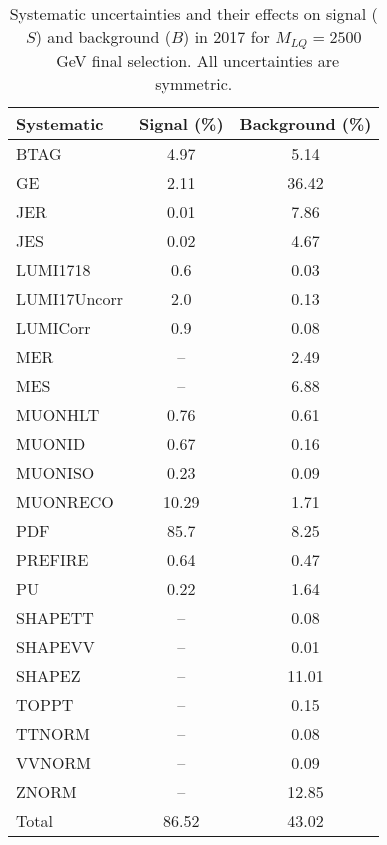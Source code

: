 \begin{table}[htbp]
\begin{center}
\caption{Systematic uncertainties and their effects on signal ($S$) and background ($B$) in 2017 for $M_{LQ}=2500$~GeV final selection. All uncertainties are symmetric.}
\begin{tabular}{lcc}
\hline\hline
Systematic & Signal (\%) & Background (\%) \\ \hline 
BTAG & 4.97 & 5.14\\ 
GE & 2.11 & 36.42\\ 
JER & 0.01 & 7.86\\ 
JES & 0.02 & 4.67\\ 
LUMI1718 & 0.6 & 0.03\\ 
LUMI17Uncorr & 2.0 & 0.13\\ 
LUMICorr & 0.9 & 0.08\\ 
MER & -- & 2.49\\ 
MES & -- & 6.88\\ 
MUONHLT & 0.76 & 0.61\\ 
MUONID & 0.67 & 0.16\\ 
MUONISO & 0.23 & 0.09\\ 
MUONRECO & 10.29 & 1.71\\ 
PDF & 85.7 & 8.25\\ 
PREFIRE & 0.64 & 0.47\\ 
PU & 0.22 & 1.64\\ 
SHAPETT & -- & 0.08\\ 
SHAPEVV & -- & 0.01\\ 
SHAPEZ & -- & 11.01\\ 
TOPPT & -- & 0.15\\ 
TTNORM & -- & 0.08\\ 
VVNORM & -- & 0.09\\ 
ZNORM & -- & 12.85\\ 
Total & 86.52 & 43.02\\ \hline \hline
\end{tabular}
\label{tab:SysUncertainties_uujj_2500}
\end{center}
\end{table}

